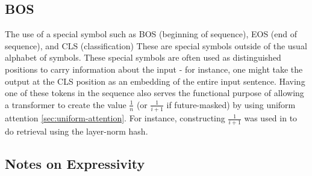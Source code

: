 \subsection{BOS}\label{sec:BOS}

The use of a special symbol such as BOS (beginning of sequence), EOS (end of sequence), and CLS (classification) These are special symbols outside of the usual alphabet of symbols. These special symbols are often used as distinguished positions to carry information about the input - for instance, one might take the output at the CLS position as an embedding of the entire input sentence. Having one of these tokens in the sequence also serves the functional purpose of allowing a transformer to create the value $\frac{1}{n}$ (or $\frac{1}{i+1}$ if future-masked) by using uniform attention \cref{sec:uniform-attention}. For instance, constructing $\frac{1}{i+1}$ was used in \citet{merrill-sabharwal-2024-cot} to do retrieval using the layer-norm hash.


\subsection{Notes on Expressivity}

